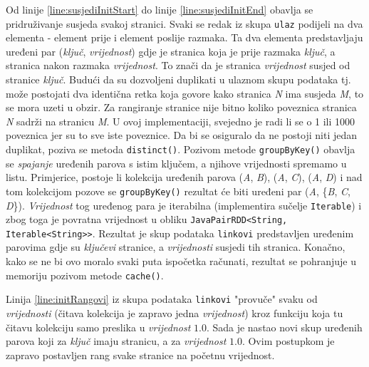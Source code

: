 \documentclass[times, utf8, zavrsni, numeric]{fer}
\begin{document}
Od linije \ref{line:susjediInitStart} do linije \ref{line:susjediInitEnd} obavlja se pridruživanje susjeda svakoj stranici. Svaki se redak iz skupa \texttt{ulaz} podijeli na dva elementa - element prije i element poslije razmaka. Ta dva elementa predstavljaju uređeni par (\emph{ključ}, \emph{vrijednost}) gdje je stranica koja je prije razmaka \emph{ključ}, a stranica nakon razmaka \emph{vrijednost}. To znači da je stranica \emph{vrijednost} susjed od stranice \emph{ključ}. Budući da su dozvoljeni duplikati u ulaznom skupu podataka tj. može postojati dva identična retka koja govore kako stranica \emph{N} ima susjeda \emph{M}, to se mora uzeti u obzir. Za rangiranje stranice nije bitno koliko poveznica stranica \emph{N} sadrži na stranicu \emph{M}. U ovoj implementaciji, svejedno je radi li se o 1 ili 1000 poveznica jer su to sve iste poveznice. Da bi se osiguralo da ne postoji niti jedan duplikat, poziva se metoda \texttt{distinct()}. Pozivom metode \texttt{groupByKey()} obavlja se \emph{spajanje} uređenih parova s istim ključem, a njihove vrijednosti spremamo u listu. Primjerice, postoje li kolekcija uređenih parova (\emph{A}, \emph{B}), (\emph{A}, \emph{C}), (\emph{A}, \emph{D}) i nad tom kolekcijom pozove se \texttt{groupByKey()} rezultat će biti uređeni par (\emph{A}, \{\emph{B}, \emph{C}, \emph{D}\}). \emph{Vrijednost} tog uređenog para je iterabilna (implementira sučelje \texttt{Iterable}) i zbog toga je povratna vrijednost u obliku \texttt{JavaPairRDD<String, Iterable<String>{}>}. Rezultat je skup podataka \texttt{linkovi} predstavljen uređenim parovima gdje su \emph{ključevi} stranice, a \emph{vrijednosti} susjedi tih stranica. Konačno, kako se ne bi ovo moralo svaki puta ispočetka računati, rezultat se pohranjuje u memoriju pozivom metode \texttt{cache()}.

Linija \ref{line:initRangovi} iz skupa podataka \texttt{linkovi} "provuče" svaku od \emph{vrijednosti} (čitava kolekcija je zapravo jedna \emph{vrijednost}) kroz funkciju koja tu čitavu kolekciju samo preslika u \emph{vrijednost} $1.0$. Sada je nastao novi skup uređenih parova koji za \emph{ključ} imaju stranicu, a za \emph{vrijednost} $1.0$. Ovim postupkom je zapravo postavljen rang svake stranice na početnu vrijednost.
\end{document}
